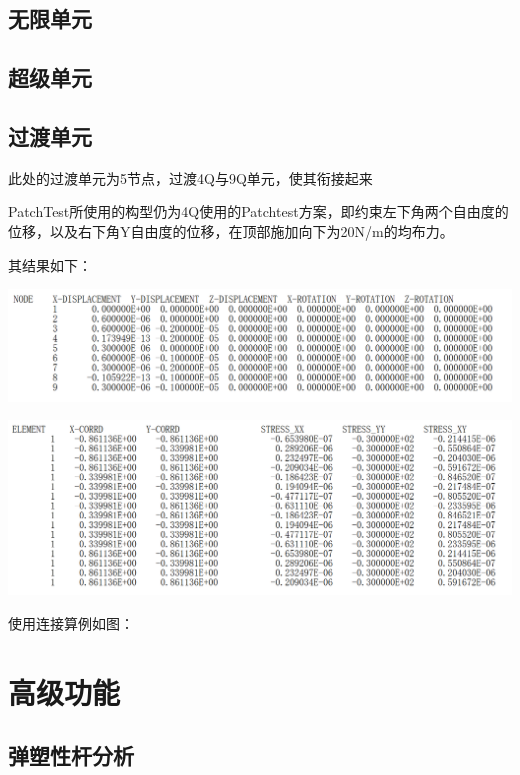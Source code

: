 \documentclass[UTF8]{ctexbook}
\begin{document}
\subsection{无限单元}

\subsection{超级单元}

\subsection{过渡单元}

此处的过渡单元为5节点，过渡4Q与9Q单元，使其衔接起来

PatchTest所使用的构型仍为4Q使用的Patchtest方案，即约束左下角两个自由度的位移，以及右下角Y自由度的位移，在顶部施加向下为20N/m的均布力。

其结果如下：
\begin{center}
\includegraphics[width=\textwidth]{9Q02.png} %
\end{center}
\begin{center}
\includegraphics[width=\textwidth]{9Q03.png} %
\end{center}

使用连接算例如图：

\section{高级功能}
\subsection{弹塑性杆分析}
\end{document}
